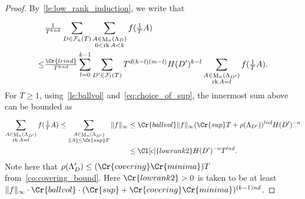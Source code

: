 \documentclass{amsart}
\theoremstyle{definition}
\theoremstyle{remark}
\DeclareMathOperator{\M}{M}
\DeclareMathOperator{\rank}{rk}
\begin{document}
\begin{proof}
    By~\cref{le:low_rank_induction}, 
    we write that
    \begin{align}
      & \tfrac{1}{T^{knd}} \sum_{D \in \mathcal{F}_{k}{(T)}} \sum_{\substack{A \in \M_{n}(\Lambda_{D}) \\ 0 <  \rank A < k }}^{}  
      f(\tfrac{1}{T} A )
      \\
        \leq &
        \tfrac{\Cr{lrind}}{T^{knd}} \sum_{l=0}^{k-1} 
        \sum_{D' \in \mathcal{F}_{l}{(T)}}^{} 
        T^{d(k-l)(m-l)}H(D')^{k-l}
        \sum_{\substack{A \in \M_{n}(\Lambda_{D'}) \\ \rank A = l }}^{}  
        f(\tfrac{1}{T}A) 
        .
    \end{align}
    For $T \geq 1$, using~\cref{le:ballvol} and~\cref{eq:choice_of_sup},
    the innermost sum above can be bounded as
    \begin{align}
        \sum_{\substack{A \in \M_{n}(\Lambda_{D'}) \\ \rank A = l }}^{}  
        f(\tfrac{1}{T}A)  \leq
        \sum_{\substack{A \in \M_{n}(\Lambda_{D'}) \\ \|A\| \leq \Cr{sup} T } }^{} \|f\|_{\infty}
      & \leq \Cr{ballvol} \|f\|_{\infty} (\Cr{sup} T + \rho(\Lambda_{D'      }))^{lnd} H(D')^{-n} \\
      & \leq \Cl[c]{lowrank2} H(D')^{-n} T^{lnd}.
    \end{align}
    Note here that $\rho(\Lambda_{D}') \leq (\Cr{covering} \Cr{minima}) T$ from~\cref{co:covering_bound}.
    Here $\Cr{lowrank2}>0$ is taken to be at least $ \|f\|_{\infty} \cdot \Cr{ballvol} \cdot (\Cr{sup} + \Cr{covering} \Cr{minima})^{(k-1)nd}$.


\end{proof}
\end{document}
